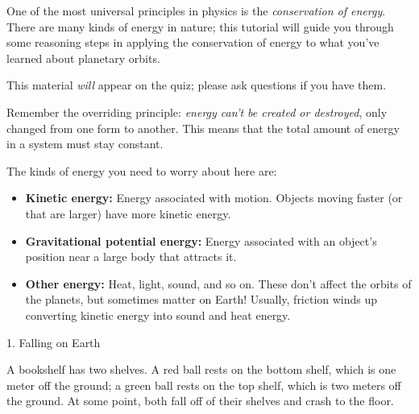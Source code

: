 \documentclass[12pt]{article}
\begin{document}
\Large
\centerline{}

\normalsize

One of the most universal principles in physics is the {\it conservation of energy}. There are many kinds
of energy in nature; this tutorial will guide you through some reasoning
steps in applying the conservation of energy to what you've learned about planetary orbits.

This material {\it will} appear on the quiz; please ask questions if you have them.

Remember the overriding principle: {\it energy can't be created or destroyed}, only changed from one form
to another. This means that the total amount of energy in a system must stay constant.

The kinds of energy you need to worry about here are:

\begin{itemize}
\item {\bf Kinetic energy:} Energy associated with motion. Objects moving faster (or that are larger)
have more kinetic energy.

\item {\bf Gravitational potential energy:} Energy associated with an object's position near a large body that
attracts it. 

\item {\bf Other energy:} Heat, light, sound, and so on. These don't affect the orbits of the planets, but 
sometimes matter on Earth! Usually, friction winds up converting kinetic energy into sound and heat energy.

\end{itemize}

\Large 1. Falling on Earth
\normalsize

A bookshelf has two shelves. A red ball rests on the bottom shelf, which is one
meter off the ground; a green ball rests on the top shelf, which is two meters
off the ground. 
At some point, both fall off of their shelves and crash to the floor.
\end{document}
